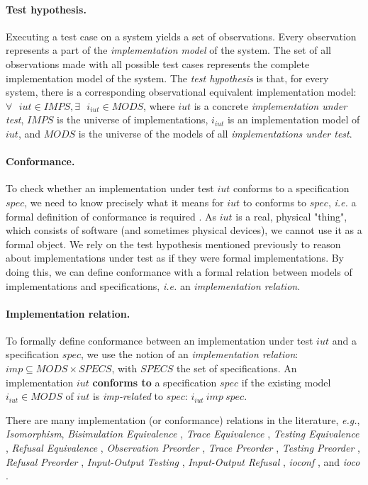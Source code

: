 \paragraph{Test hypothesis.} Executing a test case on a system
yields a set of observations. Every observation represents a
part of the \textit{implementation model} of the system. The set
of all observations made with all possible test cases represents
the complete implementation model of the system. The \emph{test
hypothesis} \cite{Bernot:1991:TAF:112287.112303} is that, for
every system, there is a corresponding observational equivalent
implementation model: $\forall \text{ } iut \in IMPS, \exists
\text{ } i_{iut} \in MODS$, where $iut$ is a concrete
\emph{implementation under test}, $IMPS$ is the universe of
implementations, $i_{iut}$ is an implementation model of $iut$,
and $MODS$ is the universe of the models of all
\emph{implementations under test}.

\paragraph{Conformance.} To check whether an implementation under
test $iut$ conforms to a specification $spec$, we need to know
precisely what it means for $iut$ to conforms to $spec$,
\emph{i.e.} a formal definition of conformance is required
\cite{ltsTretmans}. As $iut$ is a real, physical "thing", which
consists of software (and sometimes physical devices), we cannot
use it as a formal object. We rely on the test hypothesis
mentioned previously to reason about implementations under test
as if they were formal implementations. By doing this, we can
define conformance with a formal relation between models of
implementations and specifications, \emph{i.e.} an
\emph{implementation relation}.

\paragraph{Implementation relation.} To formally define
conformance between an implementation under test $iut$ and a
specification $spec$, we use the notion of an
\emph{implementation relation}: $imp \subseteq MODS \times
SPECS$, with $SPECS$ the set of specifications.  An
implementation $iut$ \textbf{conforms to} a specification $spec$
if the existing model $i_{iut} \in MODS$ of $iut$ is
\textit{imp-related} to $spec$: $i_{iut} ~imp~ spec$.

There are many implementation (or conformance) relations in the
literature, \emph{e.g.}, \emph{Isomorphism}, \emph{Bisimulation
Equivalence}
\cite{milner1989communication,Fernandez89animplementation},
\emph{Trace Equivalence} \cite{tan_testing_1995}, \emph{Testing
Equivalence} \cite{Abramsky1987225}, \emph{Refusal Equivalence}
\cite{Phillips86}, \emph{Observation Preorder}
\cite{milner1980calculus,hennessy1980observing}, \emph{Trace
Preorder} \cite{DNH84,vaandrager1991relationship}, \emph{Testing
Preorder} \cite{DNH84,Beohar2015}, \emph{Refusal Preorder}
\cite{phillips1987refusal}, \emph{Input-Output Testing}
\cite{Tre96}, \emph{Input-Output Refusal}
\cite{heerink1997refusal}, \emph{ioconf}
\cite{tretmans1996conformance}, and \emph{ioco} \cite{Tre96}.

